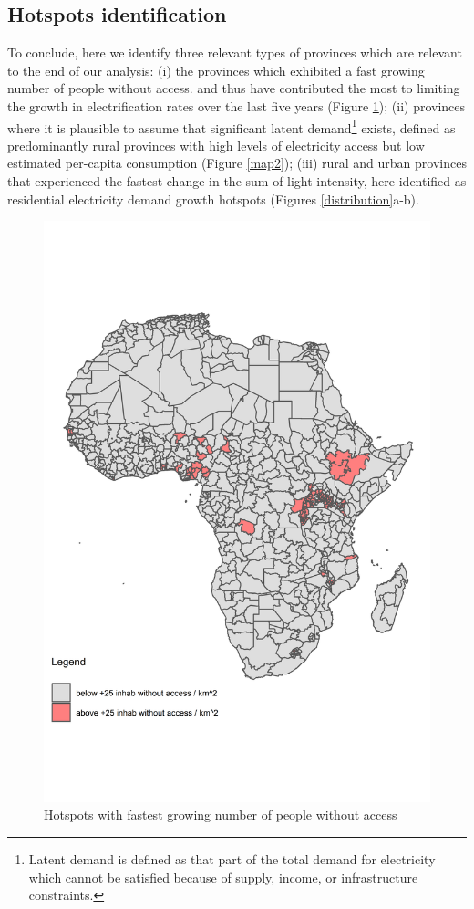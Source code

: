 \documentclass[preprint,12pt]{elsarticle}
\begin{document}
\subsection{Hotspots identification}
To conclude, here we identify three relevant types of provinces which are relevant to the end of our analysis: (i) the provinces which exhibited a fast growing number of people without access. and thus have contributed the most to limiting the growth in electrification rates over the last five years (Figure \ref{map1}); (ii) provinces where it is plausible to assume that significant latent demand\footnote{Latent demand is defined as that part of the total demand for electricity which cannot be satisfied because of supply, income, or infrastructure constraints.} exists, defined as predominantly rural provinces with high levels of electricity access but low estimated per-capita consumption (Figure \ref{map2}); (iii) rural and urban provinces that experienced the fastest change in the sum of light intensity, here identified as residential electricity demand growth hotspots (Figures \ref{distribution}a-b). 

\begin{figure}[H]
    \centering
    \includegraphics{figures/map1.png}
    \caption{Hotspots with fastest growing number of people without access}
    \label{map1}
\end{figure}
\end{document}
